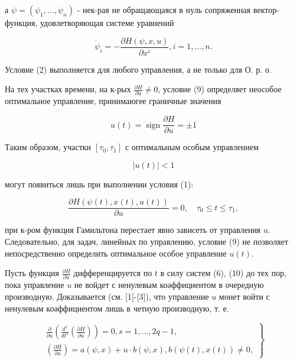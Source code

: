 \documentclass[10pt]{article}
\begin{document}
а $\psi=\left(\psi_{1}, \ldots, \psi_{n}\right)$ - нек-рая не обращающаяся в нуль сопряженная вектор-функция, удовлетворяющая системе уравнений



\[

\dot{\psi}_{i}=-\frac{\partial H(\psi, x, u)}{\partial x^{i}}, i=1, \ldots, n .

\]



Условие (2) выполняется для любого управления, а не только для О. р. о.



На тех участках времени, на к-рых $\frac{\partial H}{\partial u} \neq 0$, условие (9) определяет неособое оптимальное управление, принимаюгее граничные значения



\[

u(t)=\operatorname{sign} \frac{\partial H}{\partial u}= \pm 1

\]



Таким образом, участки $\left[\tau_{0}, \tau_{1}\right]$ с оптимальным особым управлением



\[

|u(t)|<1

\]



могут появиться лишь при выполнении условия (1):



\[

\frac{\partial H(\psi(t), x(t), u(t))}{\partial u}=0, \quad \tau_{0} \leqslant t \leqslant \tau_{1},

\]



при к-ром функция Гамильтона перестает явно зависеть от управления $u$. Следовательно, для задач, линейных по управлению, условие (9) не позволяет непосредственно определить оптимальное особое управление $u(t)$.



Пусть функция $\frac{\partial H}{\partial u}$ дифференцируется по $t$ в силу систем (6), (10) до тех пор, пока управление $u$ не войдет с ненулевым коәффициентом в очередную производную. Доказывается (см. [1]-[3]), что управление $u$ монет войти с ненулевым коәффициентом лишь в четную производную, т. е.



\[

\left.\begin{array}{c}

\frac{\partial}{\partial u}\left(\frac{d^{s}}{d t^{s}}\left(\frac{\partial H}{\partial u}\right)\right)=0, s=1, \ldots, 2 q-1, \\

\left(\frac{\partial H}{\partial u}\right)=a(\psi, x)+u \cdot b(\psi, x), b(\psi(t), x(t)) \neq 0,

\end{array}\right\}

\]
\end{document}
